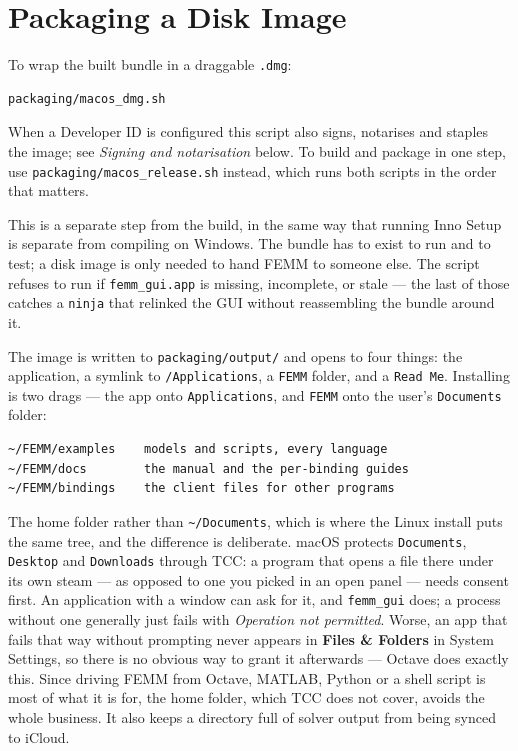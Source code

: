 \documentclass[11pt]{article}
\begin{document}
\section{Packaging a Disk Image}

To wrap the built bundle in a draggable \texttt{.dmg}:
\begin{lstlisting}
packaging/macos_dmg.sh
\end{lstlisting}

When a Developer ID is configured this script also signs, notarises and
staples the image; see \textit{Signing and notarisation} below.  To build
and package in one step, use \texttt{packaging/macos\_release.sh}
instead, which runs both scripts in the order that matters.

This is a separate step from the build, in the same way that running
Inno Setup is separate from compiling on Windows.  The bundle has to
exist to run and to test; a disk image is only needed to hand FEMM to
someone else.  The script refuses to run if \texttt{femm\_gui.app} is
missing, incomplete, or stale --- the last of those catches a
\texttt{ninja} that relinked the GUI without reassembling the bundle
around it.

The image is written to \texttt{packaging/output/} and opens to four
things: the application, a symlink to \texttt{/Applications}, a
\texttt{FEMM} folder, and a \texttt{Read Me}.  Installing is two drags ---
the app onto \texttt{Applications}, and \texttt{FEMM} onto the user's
\texttt{Documents} folder:
\begin{lstlisting}
~/FEMM/examples    models and scripts, every language
~/FEMM/docs        the manual and the per-binding guides
~/FEMM/bindings    the client files for other programs
\end{lstlisting}

The home folder rather than \texttt{\textasciitilde/Documents}, which is
where the Linux install puts the same tree, and the difference is
deliberate.  macOS protects \texttt{Documents}, \texttt{Desktop} and
\texttt{Downloads} through TCC: a program that opens a file there under
its own steam --- as opposed to one you picked in an open panel --- needs
consent first.  An application with a window can ask for it, and
\texttt{femm\_gui} does; a process without one generally just fails with
\emph{Operation not permitted}.  Worse, an app that fails that way without
prompting never appears in \textbf{Files \& Folders} in System Settings,
so there is no obvious way to grant it afterwards --- Octave does exactly
this.  Since driving FEMM from Octave, MATLAB, Python or a shell script is
most of what it is for, the home folder, which TCC does not cover, avoids
the whole business.  It also keeps a directory full of solver output from
being synced to iCloud.
\end{document}
